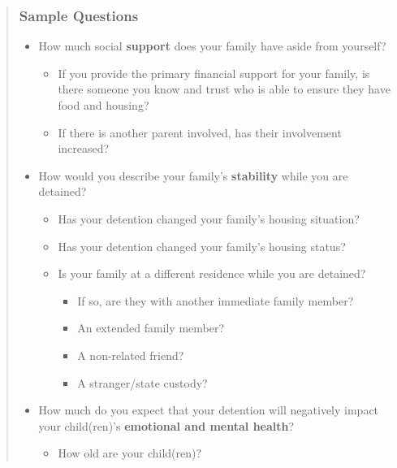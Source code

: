\documentclass[
  letterpaper,
  DIV=11,
  numbers=noendperiod]{scrartcl}
\providecommand{\tightlist}{%
  \setlength{\itemsep}{0pt}\setlength{\parskip}{0pt}}\usepackage{longtable,booktabs,array}
\begin{document}
\begin{quote}
\hypertarget{sample-questions}{%
\subsubsection{Sample Questions}\label{sample-questions}}

\begin{itemize}
\tightlist
\item
  How much social \textbf{support} does your family have aside from
  yourself?

  \begin{itemize}
  \tightlist
  \item
    If you provide the primary financial support for your family, is
    there someone you know and trust who is able to ensure they have
    food and housing?
  \item
    If there is another parent involved, has their involvement
    increased?
  \end{itemize}
\item
  How would you describe your family's \textbf{stability} while you are
  detained?

  \begin{itemize}
  \tightlist
  \item
    Has your detention changed your family's housing situation?
  \item
    Has your detention changed your family's housing status?
  \item
    Is your family at a different residence while you are detained?

    \begin{itemize}
    \tightlist
    \item
      If so, are they with another immediate family member?
    \item
      An extended family member?
    \item
      A non-related friend?
    \item
      A stranger/state custody?
    \end{itemize}
  \end{itemize}
\item
  How much do you expect that your detention will negatively impact your
  child(ren)'s \textbf{emotional and mental health}?

  \begin{itemize}
  \tightlist
  \item
    How old are your child(ren)?


\end{itemize}
\end{itemize}
\end{quote}
\end{document}
